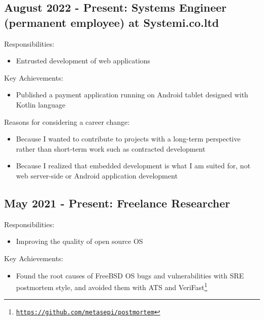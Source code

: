 \documentclass[letterpaper]{article}
\begin{document}
\subsection*{August 2022 - Present: Systems Engineer (permanent employee) at Systemi.co.ltd}

\noindent Responsibilities:

\begin{itemize}
  \item Entrusted development of web applications
\end{itemize}

\noindent Key Achievements:

\begin{itemize}
  \item Published a payment application running on Android tablet designed with Kotlin language
\end{itemize}

\noindent Reasons for considering a career change:

\begin{itemize}
  \item Because I wanted to contribute to projects with a long-term perspective rather than short-term work such as contracted development
  \item Because I realized that embedded development is what I am suited for, not web server-side or Android application development
\end{itemize}

\subsection*{May 2021 - Present: Freelance Researcher}

\noindent Responsibilities:

\begin{itemize}
  \item Improving the quality of open source OS
\end{itemize}

\noindent Key Achievements:

\begin{itemize}
  \item Found the root causes of FreeBSD OS bugs and vulnerabilities with SRE postmortem style, and avoided them with ATS and VeriFast\footnote{\href{https://github.com/metasepi/postmortem}{\tt https://github.com/metasepi/postmortem}}
\end{itemize}
\end{document}

